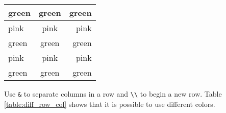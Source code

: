 \begin{center}
\label{table:diff_row_col}
\begin{tabular}{l | c | r}
green & green & green \\
\hline
pink & pink & pink \\
green & green & green \\
pink & pink & pink \\
green & green & green \\
\end{tabular}
\end{center}
\noindent
Use \verb+&+ to separate columns in a row and \verb+\\+ to begin a new row. Table \ref{table:diff_row_col} shows that it is possible to use different colors.
